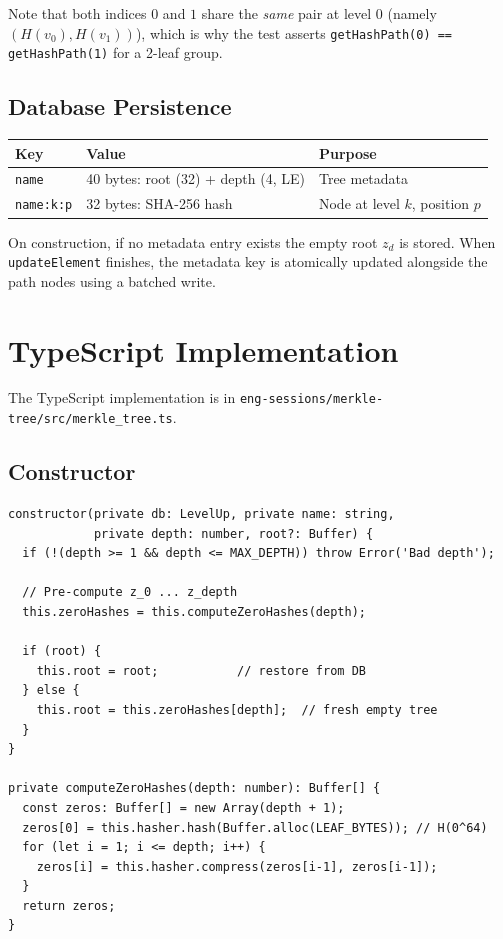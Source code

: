 \documentclass[12pt,a4paper]{article}
\begin{document}
Note that both indices $0$ and $1$ share the \emph{same} pair at level 0
(namely $(H(v_0), H(v_1))$), which is why the test asserts
\texttt{getHashPath(0) == getHashPath(1)} for a 2-leaf group.

\subsection{Database Persistence}

\begin{center}
\begin{tabular}{lll}
\toprule
\textbf{Key} & \textbf{Value} & \textbf{Purpose} \\
\midrule
\texttt{name} & 40 bytes: root (32) + depth (4, LE) & Tree metadata \\
\texttt{name:k:p} & 32 bytes: SHA-256 hash & Node at level $k$, position $p$ \\
\bottomrule
\end{tabular}
\end{center}

On construction, if no metadata entry exists the empty root $z_d$ is stored.
When \texttt{updateElement} finishes, the metadata key is atomically updated
alongside the path nodes using a batched write.

\section{TypeScript Implementation}

The TypeScript implementation is in
\texttt{eng-sessions/merkle-tree/src/merkle\_tree.ts}.

\subsection{Constructor}

\begin{lstlisting}[style=tscode, caption={TypeScript constructor — zero hash computation and root initialisation}]
constructor(private db: LevelUp, private name: string,
            private depth: number, root?: Buffer) {
  if (!(depth >= 1 && depth <= MAX_DEPTH)) throw Error('Bad depth');

  // Pre-compute z_0 ... z_depth
  this.zeroHashes = this.computeZeroHashes(depth);

  if (root) {
    this.root = root;           // restore from DB
  } else {
    this.root = this.zeroHashes[depth];  // fresh empty tree
  }
}

private computeZeroHashes(depth: number): Buffer[] {
  const zeros: Buffer[] = new Array(depth + 1);
  zeros[0] = this.hasher.hash(Buffer.alloc(LEAF_BYTES)); // H(0^64)
  for (let i = 1; i <= depth; i++) {
    zeros[i] = this.hasher.compress(zeros[i-1], zeros[i-1]);
  }
  return zeros;
}
\end{lstlisting}
\end{document}
